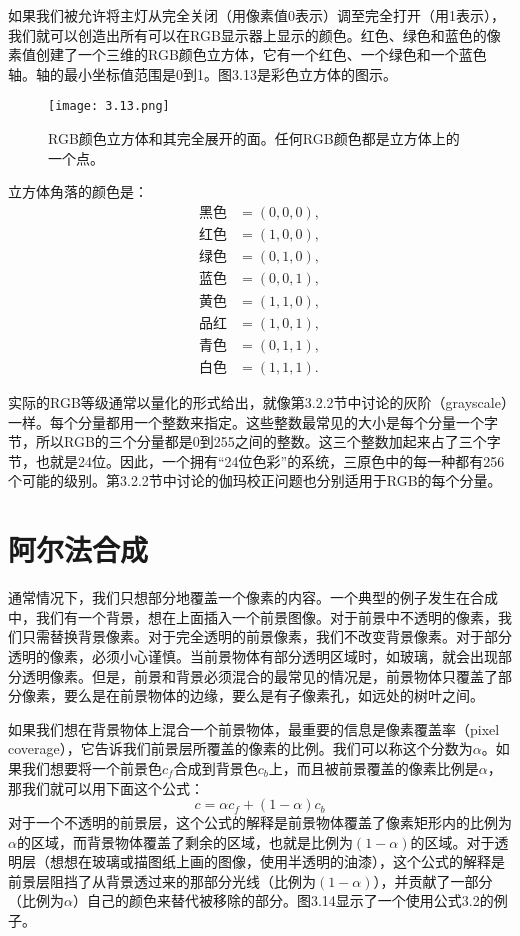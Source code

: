 \documentclass[lang=cn,12pt,marginpar=margintrue]{elegantbook}
\begin{document}
如果我们被允许将主灯从完全关闭（用像素值0表示）调至完全打开（用1表示），我们就可以创造出所有可以在RGB显示器上显示的颜色。红色、绿色和蓝色的像素值创建了一个三维的RGB颜色立方体，它有一个红色、一个绿色和一个蓝色轴。轴的最小坐标值范围是0到1。图3.13是彩色立方体的图示。

\begin{figure}[htb]
  \centering
  \texttt{[image: 3.13.png]}
  \caption{RGB颜色立方体和其完全展开的面。任何RGB颜色都是立方体上的一个点。}
\end{figure}

立方体角落的颜色是：
\[
  \begin{aligned}
    \text{黑色} & = (0,0,0), \\
    \text{红色} & = (1,0,0), \\
    \text{绿色} & = (0,1,0), \\
    \text{蓝色} & = (0,0,1), \\
    \text{黄色} & = (1,1,0), \\
    \text{品红} & = (1,0,1), \\
    \text{青色} & = (0,1,1), \\
    \text{白色} & = (1,1,1).
  \end{aligned}
\]

实际的RGB等级通常以量化的形式给出，就像第3.2.2节中讨论的灰阶（grayscale）一样。每个分量都用一个整数来指定。这些整数最常见的大小是每个分量一个字节，所以RGB的三个分量都是0到255之间的整数。这三个整数加起来占了三个字节，也就是24位。因此，一个拥有“24位色彩”的系统，三原色中的每一种都有256个可能的级别。第3.2.2节中讨论的伽玛校正问题也分别适用于RGB的每个分量。

\section{阿尔法合成}

通常情况下，我们只想部分地覆盖一个像素的内容。一个典型的例子发生在合成中，我们有一个背景，想在上面插入一个前景图像。对于前景中不透明的像素，我们只需替换背景像素。对于完全透明的前景像素，我们不改变背景像素。对于部分透明的像素，必须小心谨慎。当前景物体有部分透明区域时，如玻璃，就会出现部分透明像素。但是，前景和背景必须混合的最常见的情况是，前景物体只覆盖了部分像素，要么是在前景物体的边缘，要么是有子像素孔，如远处的树叶之间。

如果我们想在背景物体上混合一个前景物体，最重要的信息是像素覆盖率（pixel coverage），它告诉我们前景层所覆盖的像素的比例。我们可以称这个分数为$\alpha $。如果我们想要将一个前景色$c_f$合成到背景色$c_b$上，而且被前景覆盖的像素比例是$\alpha $，那我们就可以用下面这个公式：
\begin{equation}
  c = \alpha c_f + (1 - \alpha )c_b
\end{equation}
对于一个不透明的前景层，这个公式的解释是前景物体覆盖了像素矩形内的比例为$\alpha $的区域，而背景物体覆盖了剩余的区域，也就是比例为$(1-\alpha )$的区域。对于透明层（想想在玻璃或描图纸上画的图像，使用半透明的油漆），这个公式的解释是前景层阻挡了从背景透过来的那部分光线（比例为$(1-\alpha )$），并贡献了一部分（比例为$\alpha $）自己的颜色来替代被移除的部分。图3.14显示了一个使用公式3.2的例子。
\end{document}
